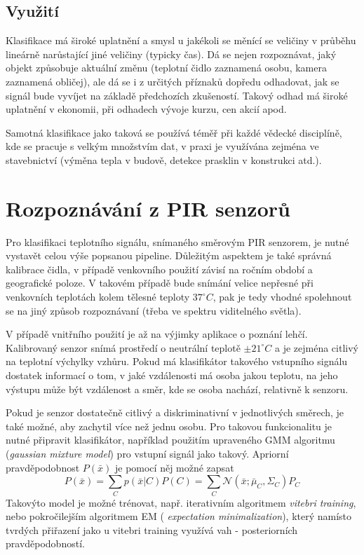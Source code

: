 \documentclass[10pt,a4paper,titlepage]{article}
\begin{document}
  \subsection{Využití}
  Klasifikace má široké uplatnění a smysl u jakékoli se měnící se veličiny v průběhu lineárně narůstající
  jiné veličiny (typicky čas). Dá se nejen rozpoznávat, jaký objekt způsobuje aktuální změnu
  (teplotní čidlo zaznamená osobu, kamera zaznamená obličej), ale dá se i z určitých příznaků
  dopředu odhadovat, jak se signál bude vyvíjet na základě předchozích zkušeností. Takový odhad
  má široké uplatnění v ekonomii, při odhadech vývoje kurzu, cen akcií apod.

  Samotná klasifikace jako taková se používá téměř při každé vědecké disciplíně, kde se pracuje
  s velkým množstvím dat, v praxi je využívána zejména ve stavebnictví (výměna tepla v budově,
  detekce prasklin v konstrukci atd.).

  \section{Rozpoznávání z PIR senzorů}
  Pro klasifikaci teplotního signálu, snímaného směrovým PIR senzorem, je nutné vystavět celou
  výše popsanou pipeline. Důležitým aspektem je také správná kalibrace čidla, v případě venkovního
  použití závisí na ročním období a geografické poloze. V takovém případě bude snímání velice nepřesné
  při venkovních teplotách kolem tělesné teploty $37^{\circ}C$, pak je tedy vhodné
  spolehnout se na jiný způsob rozpoznávaní (třeba ve spektru viditelného světla).

  V případě vnitřního použití je až na výjimky aplikace o poznání lehčí. Kalibrovaný senzor snímá prostředí
  o neutrální teplotě $\pm 21^{\circ}C$ a je zejména citlivý na teplotní výchylky vzhůru.
  Pokud má klasifikátor takového vstupního signálu dostatek informací o tom, v jaké vzdálenosti má
  osoba jakou teplotu, na jeho výstupu může být vzdálenost a směr, kde se osoba nachází, relativně k senzoru.

  Pokud je senzor dostatečně citlivý a diskriminativní v jednotlivých směrech, je také možné, aby zachytil
  více než jednu osobu. Pro takovou funkcionalitu je nutné připravit klasifikátor, například použitím
  upraveného GMM algoritmu ({\it gaussian mixture model}) pro vstupní signál jako takový. Apriorní
  pravděpodobnost $P(\bar{x})$ je pomocí něj možné zapsat $$P(\bar{x}) = \sum_{C} p(\bar{x} | C)
  P(C) = \sum_{C} \mathcal{N}(\bar{x}; \bar{\mu}_C,\Sigma_C) P_C$$ Takovýto model je možné trénovat,
  např. iterativním algoritmem {\it vitebri training}, nebo pokročilejším algoritmem EM ({\it
  expectation minimalization}), který namísto tvrdých přiřazení jako u vitebri training využívá vah
  - posteriorních pravděpodobností.
\end{document}
